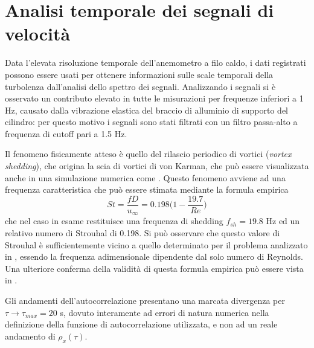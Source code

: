 \documentclass{article} %
\begin{document}
\section{Analisi temporale dei segnali di velocità}
Data l'elevata risoluzione temporale dell'anemometro a filo caldo, i dati registrati possono essere usati per ottenere informazioni sulle scale temporali della turbolenza dall'analisi dello spettro dei segnali. Analizzando i segnali si è osservato un contributo elevato in tutte le misurazioni per frequenze inferiori a 1 Hz, causato dalla vibrazione elastica del braccio di alluminio di supporto del cilindro: per questo motivo i segnali sono stati filtrati con un filtro passa-alto a frequenza di cutoff pari a 1.5 Hz.\par
Il fenomeno fisicamente atteso è quello del rilascio periodico di vortici (\textit{vortex shedding}), che origina la scia di vortici di von Karman, che può essere visualizzata anche in una simulazione numerica come \cite{lopez_cyl}. Questo fenomeno avviene ad una frequenza caratteristica che può essere stimata mediante la formula empirica
$$ St = \frac{f D}{u_{\infty}} = 0.198 \Big(1-\frac{19.7}{Re}\Big) $$
che nel caso in esame restituisce una frequenza di shedding $f_{sh} = 19.8$ Hz ed un relativo numero di Strouhal di 0.198. Si può osservare che questo valore di Strouhal è sufficientemente vicino a quello determinato per il problema analizzato in \cite{braza06}, essendo la frequenza adimensionale dipendente dal solo numero di Reynolds. Una ulteriore conferma della validità di questa formula empirica può essere vista in \cite[fig.~5]{roshko61}.\par
Gli andamenti dell'autocorrelazione presentano una marcata divergenza per $\tau \to \tau_{max} = 20$ s, dovuto interamente ad errori di natura numerica nella definizione della funzione di autocorrelazione utilizzata, e non ad un reale andamento di $\rho_x(\tau)$.
\end{document}
